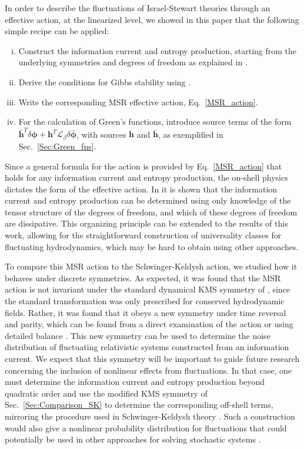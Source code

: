 \documentclass[aps,prd,nofootinbib,amsmath,amssymb,showpacs,longbibliography,singlecolumn,superscriptaddress,notitlepage]{revtex4-1}
\theoremstyle{plain}
\theoremstyle{definition}
\newcommand{\cvec}[1]{\ensuremath{\bm {#1}}}
\begin{document}
In order to describe the fluctuations of Israel-Stewart theories through an effective action, at the linearized level, we showed in this paper that the following simple recipe can be applied: 
\begin{enumerate}[i.]
    \item Construct the information current and entropy production, starting from the underlying symmetries and degrees of freedom as explained in \cite{Gavassino:2023odx,Gavassino:2023qwl}.
    \item Derive the conditions for Gibbs stability using \cite{Gavassino:2021cli}.
    \item Write the corresponding MSR effective action, Eq.\ \eqref{MSR_action}.
    \item For the calculation of Green's functions, introduce source terms of the form $\bar{\cvec{h}}^T \delta\cvec{\phi} + \cvec{h}^T\mathcal{L}_\beta \delta\bar{\cvec{\phi}}$, with sources 
    $\cvec{h}$ and $\bar{\cvec{h}}$, as exemplified in Sec.~\ref{Sec:Green_fns}. 
\end{enumerate}
Since a general formula for the action is provided by Eq.\ \eqref{MSR_action} that holds for any information current and entropy production, the on-shell physics dictates the form of the effective action. In \cite{Gavassino:2023odx, Gavassino:2023qwl} it is shown that the information current and entropy production can be determined using only knowledge of the tensor structure of the degrees of freedom, and which of these degrees of freedom are dissipative. This organizing principle can be extended to the results of this work, allowing for the straightforward construction of universality classes for fluctuating hydrodynamics, which may be hard to obtain using other approaches.


To compare this MSR action to the Schwinger-Keldysh action, we studied how it behaves under discrete symmetries. As expected, it was found that the MSR action is not invariant under the standard dynamical KMS symmetry of \cite{Liu:2018kfw}, since the standard transformation was only prescribed for conserved hydrodynamic fields. Rather, it was found that it obeys a new symmetry under time reversal and parity, which can be found from a direct examination of the action or using detailed balance \cite{Guo:2022ixk}. This new symmetry can be used to determine the noise distribution of fluctuating relativistic systems constructed from an information current. We expect that this symmetry will be important to guide future research concerning the inclusion of nonlinear effects from fluctuations. In that case, one must determine the information current and entropy production beyond quadratic order and use the modified KMS symmetry of Sec.\ \ref{Sec:Comparison_SK} to determine the corresponding off-shell terms, mirroring the procedure used in Schwinger-Keldysh theory \cite{Jain:2020zhu}. Such a construction would also give a nonlinear probability distribution for fluctuations that could potentially be used in other approaches for solving stochastic systems \cite{barabasi1995fractal}.
\end{document}
